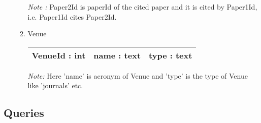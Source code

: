 \documentclass[10pt]{article}
\begin{document}
\begin{enumerate}
\begin{enumerate}
\emph{Note :} Paper2Id is paperId of the cited paper and it is cited by Paper1Id, i.e. Paper1Id cites Paper2Id.

\item Venue\\
        \begin{tabular}{|c|c|c|}
            \hline 
             VenueId : int & name : text & type : text\\
            \hline
        \end{tabular}

\emph{Note:} Here 'name' is acronym of Venue and 'type' is the type of Venue like 'journals' etc. 
\end{enumerate}

\end{enumerate}

\subsection{Queries}
\end{document}
